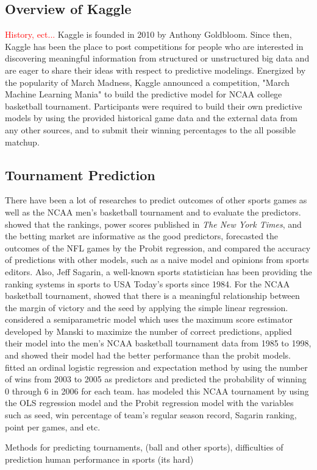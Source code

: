 \subsection{Overview of Kaggle}
\textcolor{red}{History, ect...}    
Kaggle is founded in 2010 by Anthony Goldbloom. Since then, Kaggle has been the place to post competitions for people who are interested in discovering meaningful information from structured or unstructured big data and are eager to share their ideas with respect to predictive modelings. Energized by the popularity of March Madness, Kaggle announced a competition, "March Machine Learning Mania" to build the predictive model for NCAA college basketball tournament. Participants were required to build their own predictive models by using the provided historical game data and the external data from any other sources, and to submit their winning percentages to the all possible matchup.

\subsection{Tournament Prediction}

There have been a lot of researches to predict outcomes of other sports games as well as the NCAA men's basketball tournament and to evaluate the predictors. \cite{boulier1999sports} showed that the rankings, power scores published in \emph{The New York Times}, and the betting market are informative as the good predictors, forecasted the outcomes of the NFL games by the Probit regression, and compared the accuracy of predictions with other models, such as a naive model and opinions from sports editors. Also, Jeff Sagarin, a well-known sports statistician has been providing the ranking systems in sports to USA Today's sports since 1984. For the NCAA basketball tournament, \cite{smith1999can} showed that there is a meaningful relationship between the margin of victory and the seed by applying the simple linear regression. \cite{caudill2003predicting} considered a semiparametric model which uses the maximum score estimator developed by Manski to maximize the number of correct predictions, applied their model into the men's NCAA basketball tournament data from 1985 to 1998, and showed their model had the better performance than the probit models. \cite{west2006simple} fitted an ordinal logistic regression and expectation method by using the number of wins from 2003 to 2005 as predictors and predicted the probability of winning 0 through 6 in 2006 for each team. \cite{wright2012statistical} has modeled this NCAA tournament by using the OLS regression model and the Probit regression model with the variables such as seed, win percentage of team's regular season record, Sagarin ranking, point per games, and etc. 
 

Methods for predicting tournaments, (ball and other sports), difficulties of prediction human performance in sports (its hard)
